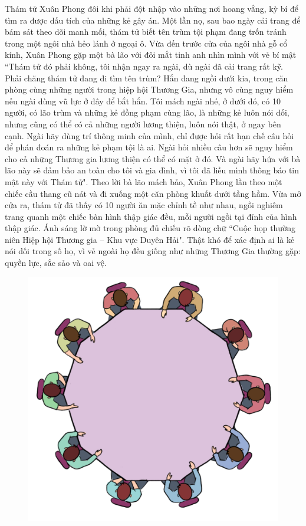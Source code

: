 \centering
\endgroup
\vspace*{60 pt} 
\begin{multicols}{2}
	Thám tử Xuân Phong đôi khi phải đột nhập vào những nơi hoang vắng, kỳ bí để tìm ra được dấu tích của những kẻ gây án. Một lần nọ, sau bao ngày cải trang để bám sát theo dõi manh mối, thám tử biết tên trùm tội phạm đang trốn tránh trong một ngôi nhà hẻo lánh ở ngoại ô. Vừa đến trước cửa của ngôi nhà gỗ cổ kính, Xuân Phong gặp một bà lão với đôi mắt tinh anh nhìn mình với vẻ bí mật ``Thám tử đó phải không, tôi nhận ngay ra ngài, dù ngài đã cải trang rất kỹ. Phải chăng thám tử đang đi tìm tên trùm? Hắn đang ngồi dưới kia, trong căn phòng cùng những người trong hiệp hội Thương Gia, nhưng vô cùng nguy hiểm nếu ngài dùng vũ lực ở đây để bắt hắn. Tôi mách ngài nhé, ở dưới đó, có 10 người, có lão trùm và những kẻ đồng phạm cùng lão, là những kẻ luôn nói dối, nhưng cũng có thể có cả những người lương thiện, luôn nói thật, ở ngay bên cạnh. Ngài hãy dùng trí thông minh của mình, chỉ được hỏi rất hạn chế câu hỏi để phán đoán ra những kẻ phạm tội là ai. Ngài hỏi nhiều câu hơn sẽ nguy hiểm cho cả những Thương gia lương thiện có thể có mặt ở đó. Và ngài hãy hứa với bà lão này sẽ đảm bảo an toàn cho tôi và gia đình, vì tôi đã liều mình thông báo tin mật này với Thám tử".
	\vskip 0.1cm
	Theo lời bà lão mách bảo, Xuân Phong lần theo một chiếc cầu thang cũ nát và đi xuống một căn phòng khuất dưới tầng hầm. Vừa mở cửa ra, thám tử đã thấy có 10 người ăn mặc chỉnh tề như nhau, ngồi nghiêm trang quanh một chiếc bàn hình thập giác đều, mỗi người ngồi tại đỉnh của hình thập giác. Ánh sáng lờ mờ trong phòng đủ chiếu rõ dòng chữ ``Cuộc họp thường niên Hiệp hội Thương gia -- Khu vực Duyên Hải". Thật khó để xác định ai là kẻ nói dối trong số họ, vì vẻ ngoài họ đều giống như những Thương Gia thường gặp: quyền lực, sắc sảo và oai vệ.
	\begin{figure}[H]
		\centering
		\vspace*{-5pt}
		\captionsetup{labelformat= empty, justification=centering}
		\includegraphics[width=1\linewidth]{xp}

\end{figure}
\end{multicols}
